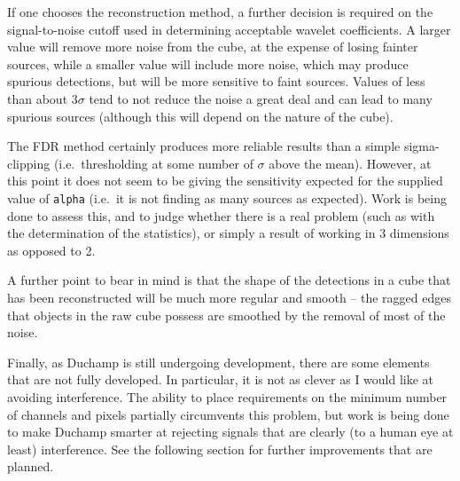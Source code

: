 \documentclass[12pt,a4paper]{article}
\newcommand{\ie}{i.e.\ }
\begin{document}
If one chooses the reconstruction method, a further decision is
required on the signal-to-noise cutoff used in determining acceptable
wavelet coefficients. A larger value will remove more noise from the
cube, at the expense of losing fainter sources, while a smaller value
will include more noise, which may produce spurious detections, but
will be more sensitive to faint sources. Values of less than about
$3\sigma$ tend to not reduce the noise a great deal and can lead to
many spurious sources (although this will depend on the nature of the
cube).

The FDR method certainly produces more reliable results than a simple
sigma-clipping (\ie thresholding at some number of $\sigma$ above the
mean). However, at this point it does not seem to be giving the
sensitivity expected for the supplied value of {\tt alpha} (\ie it is
not finding as many sources as expected). Work is
being done to assess this, and to judge whether there is a real
problem (such as with the determination of the statistics), or simply
a result of working in 3 dimensions as opposed to 2.

A further point to bear in mind is that the shape of the detections in
a cube that has been reconstructed will be much more regular and
smooth -- the ragged edges that objects in the raw cube possess are
smoothed by the removal of most of the noise.

Finally, as Duchamp is still undergoing development, there are some
elements that are not fully developed. In particular, it is not as
clever as I would like at avoiding interference. The ability to place
requirements on the minimum number of channels and pixels partially
circumvents this problem, but work is being done to make Duchamp
smarter at rejecting signals that are clearly (to a human eye at
least) interference. See the following section for further
improvements that are planned.
\end{document}
